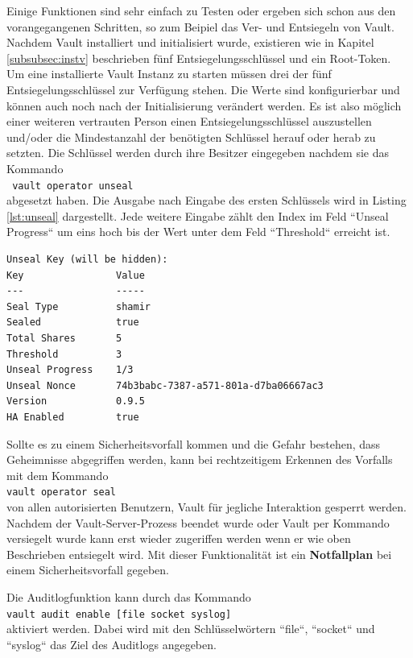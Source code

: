 \documentclass[
book,
a4paper,   
titlepage,  
halfparskip,
12pt        
]{scrartcl}
\newcommand\inline{\lstinline[basicstyle=\ttfamily]}
\begin{document}
\begin{onehalfspacing}
Einige Funktionen sind sehr einfach zu Testen oder ergeben sich schon aus den vorangegangenen Schritten, so zum Beipiel das Ver- und Entsiegeln von Vault. Nachdem Vault installiert und initialisiert wurde, existieren wie in Kapitel \vref{subsubsec:instv} beschrieben fünf Entsiegelungsschlüssel und ein Root-Token. Um eine installierte Vault Instanz zu starten müssen drei der fünf Entsiegelungsschlüssel zur Verfügung stehen. Die Werte sind konfigurierbar und können auch noch nach der Initialisierung verändert werden. Es ist also möglich einer weiteren vertrauten Person einen Entsiegelungsschlüssel auszustellen und/oder die Mindestanzahl der benötigten Schlüssel herauf oder herab zu setzten. Die Schlüssel werden durch ihre Besitzer eingegeben nachdem sie das Kommando\\\inline| vault operator unseal|\\abgesetzt haben. Die Ausgabe nach Eingabe des ersten Schlüssels wird in Listing \vref{lst:unseal} dargestellt. Jede weitere Eingabe zählt den Index im Feld ``Unseal Progress`` um eins hoch bis der Wert unter dem Feld ``Threshold`` erreicht ist. 
\begin{lstlisting}[caption={[Entsiegelungsprozess] Erster Schritt im Entsiegelungsprozess von Vault}, label=lst:unseal, captionpos=b, basicstyle=\ttfamily] 
Unseal Key (will be hidden): 
Key                Value
---                -----
Seal Type          shamir
Sealed             true
Total Shares       5
Threshold          3
Unseal Progress    1/3
Unseal Nonce       74b3babc-7387-a571-801a-d7ba06667ac3
Version            0.9.5
HA Enabled         true
\end{lstlisting}
Sollte es zu einem Sicherheitsvorfall kommen und die Gefahr bestehen, dass Geheimnisse abgegriffen werden, kann bei rechtzeitigem Erkennen des Vorfalls mit dem Kommando\\\inline|vault operator seal|\\von allen autorisierten Benutzern, Vault für jegliche Interaktion gesperrt werden. Nachdem der Vault-Server-Prozess beendet wurde oder Vault per Kommando versiegelt wurde kann erst wieder zugeriffen werden wenn er wie oben Beschrieben entsiegelt wird. Mit dieser Funktionalität ist ein \textbf{Notfallplan} bei einem Sicherheitsvorfall gegeben.

Die Auditlogfunktion kann durch das Kommando\\\inline|vault audit enable [file socket syslog]|\\aktiviert werden. Dabei wird mit den Schlüsselwörtern ``file``, ``socket`` und ``syslog`` das Ziel des Auditlogs angegeben.


\end{onehalfspacing}
\end{document}
